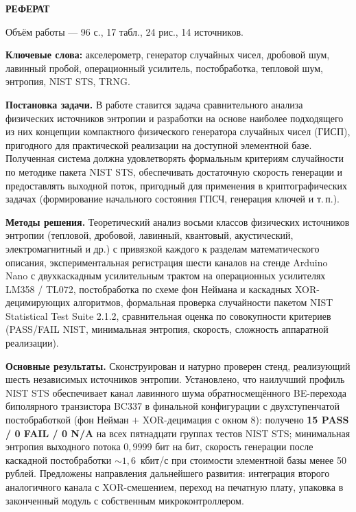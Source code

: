 \clearpage
\thispagestyle{plain}
\setcounter{page}{2}
\singlespacing

{\centering\bfseries РЕФЕРАТ\par}\vspace{0.6ex}

\noindent
Объём работы --- 96 с., 17 табл., 24 рис., 14 источников.

\textbf{Ключевые слова:} акселерометр, генератор случайных чисел, дробовой
шум, лавинный пробой, операционный усилитель, постобработка, тепловой шум,
энтропия, NIST STS, TRNG.

\vspace{0.4ex}

\textbf{Постановка задачи.} В работе ставится задача сравнительного анализа
физических источников энтропии и разработки на основе наиболее подходящего из
них концепции компактного физического генератора случайных чисел (ГИСП),
пригодного для практической реализации на доступной элементной базе. Полученная
система должна удовлетворять формальным критериям случайности по методике
пакета NIST STS, обеспечивать достаточную скорость генерации и предоставлять
выходной поток, пригодный для применения в криптографических задачах
(формирование начального состояния ГПСЧ, генерация ключей и т.\,п.).

\textbf{Методы решения.} Теоретический анализ восьми классов физических
источников энтропии (тепловой, дробовой, лавинный, квантовый, акустический,
электромагнитный и др.) с привязкой каждого к разделам математического
описания, экспериментальная регистрация шести каналов на стенде Arduino Nano
с двухкаскадным усилительным трактом на операционных усилителях LM358 / TL072,
постобработка по схеме фон Неймана и каскадных XOR-децимирующих алгоритмов,
формальная проверка случайности пакетом NIST Statistical Test Suite 2.1.2,
сравнительная оценка по совокупности критериев (PASS/FAIL NIST, минимальная
энтропия, скорость, сложность аппаратной реализации).

\textbf{Основные результаты.} Сконструирован и натурно проверен стенд,
реализующий шесть независимых источников энтропии. Установлено, что наилучший
профиль NIST STS обеспечивает канал лавинного шума обратносмещённого BE-перехода
биполярного транзистора BC337 в финальной конфигурации с двухступенчатой
постобработкой (фон Нейман $+$ XOR-децимация с окном 8): получено
\textbf{15 PASS / 0 FAIL / 0 N/A} на всех пятнадцати группах тестов NIST STS;
минимальная энтропия выходного потока $0{,}9999$ бит на бит, скорость генерации
после каскадной постобработки $\sim 1{,}6$~кбит/с при стоимости элементной базы
менее 50 рублей. Предложены направления дальнейшего развития: интеграция
второго аналогичного канала с XOR-смешением, переход на печатную плату,
упаковка в законченный модуль с собственным микроконтроллером.

